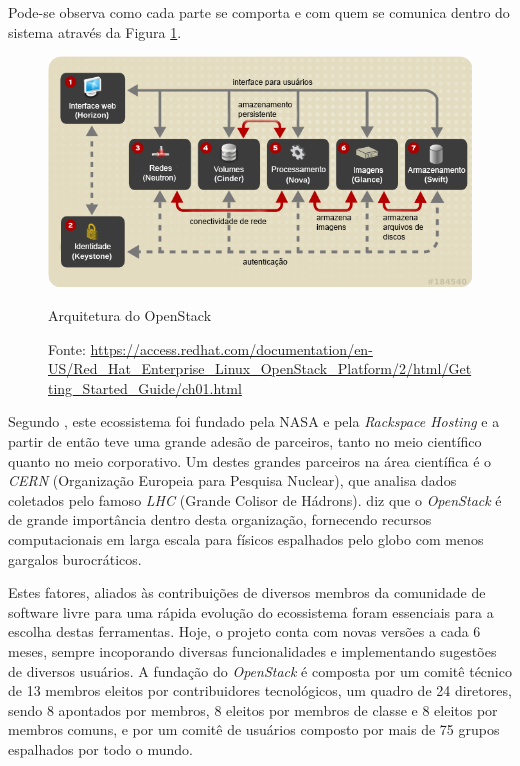 Pode-se observa como cada parte se comporta e com quem se comunica dentro do sistema
através da Figura \ref{img:openstack-services}.

\begin{figure}[h]
  \center
  \includegraphics[scale=1.0]{imagem/openstack-services.png}
  \caption{Arquitetura do OpenStack}
  \caption*{Fonte: \url{https://access.redhat.com/documentation/en-US/Red_Hat_Enterprise_Linux_OpenStack_Platform/2/html/Getting_Started_Guide/ch01.html}}
  \label{img:openstack-services}
\end{figure}

Segundo , este ecossistema foi fundado pela NASA e
pela \emph{Rackspace Hosting} e a partir de então teve uma grande adesão de
parceiros, tanto no meio científico quanto no meio corporativo. Um destes
grandes parceiros na área científica é o \emph{CERN} (Organização Europeia
para Pesquisa Nuclear), que analisa dados coletados pelo famoso \emph{LHC}
(Grande Colisor de Hádrons).  diz que
o \emph{OpenStack} é de grande importância dentro desta organização, fornecendo
recursos computacionais em larga escala para físicos espalhados pelo globo com
menos gargalos burocráticos.

Estes fatores, aliados às contribuições de diversos membros da comunidade de
software livre para uma rápida evolução do ecossistema foram essenciais para a
escolha destas ferramentas. Hoje, o projeto conta com novas versões a cada 6
meses, sempre incoporando diversas funcionalidades e implementando sugestões
de diversos usuários. A fundação do \emph{OpenStack} é composta por um comitê
técnico de 13 membros eleitos por contribuidores tecnológicos, um quadro de
24 diretores, sendo 8 apontados por membros, 8 eleitos por membros de classe e
8 eleitos por membros comuns, e por um comitê de usuários composto por mais de
75 grupos espalhados por todo o mundo.

